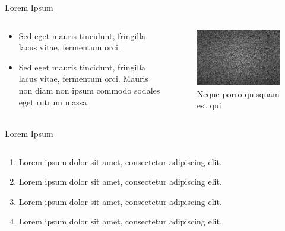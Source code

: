 \documentclass[UKenglish, aspectratio = 169]{beamer}
\begin{document}
\begin{frame}{Lorem Ipsum}
	\begin{columns}
		\begin{column}[T]{0.5\textwidth}
			\vspace*{4ex}
			\begin{itemize}
				\item Sed eget mauris tincidunt, fringilla lacus vitae, fermentum orci.
				\item Sed eget mauris tincidunt, fringilla lacus vitae, fermentum orci. Mauris non diam non ipsum commodo sodales eget rutrum massa.
			\end{itemize}
		\end{column}
		\begin{column}{0.5\textwidth}
			\begin{figure}
				\centering
				\includegraphics{figs/stock photo.jpg}
				\caption{\tiny{Neque porro quisquam est qui }}
			\end{figure}
		\end{column}
	\end{columns}
\end{frame}

\begin{frame}{Lorem Ipsum}
	\begin{columns}
		\begin{column}[T]{0.8\textwidth}
			\vspace*{4ex}
			\begin{enumerate}
				\item Lorem ipsum dolor sit amet, consectetur adipiscing elit.
				\item Lorem ipsum dolor sit amet, consectetur adipiscing elit.
				\item Lorem ipsum dolor sit amet, consectetur adipiscing elit.
				\item Lorem ipsum dolor sit amet, consectetur adipiscing elit.
			\end{enumerate}
		\end{column}
		\begin{column}{0.2\textwidth}
		\end{column}
	\end{columns}
\end{frame}
\end{document}
